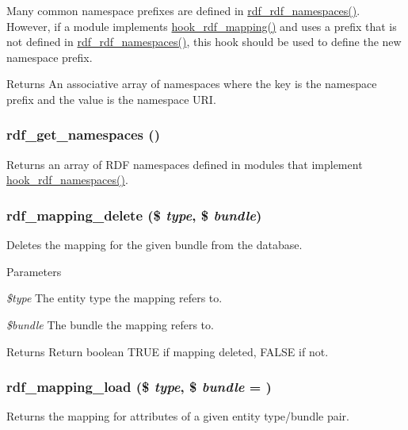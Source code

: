 Many common namespace prefixes are defined in \hyperlink{group__rdf_gaed65d375e129af058947c2d614eb1d3c}{rdf\_\-rdf\_\-namespaces()}. However, if a module implements \hyperlink{group__rdf_gae3e7f047bdcb9309b323e2af09966765}{hook\_\-rdf\_\-mapping()} and uses a prefix that is not defined in \hyperlink{group__rdf_gaed65d375e129af058947c2d614eb1d3c}{rdf\_\-rdf\_\-namespaces()}, this hook should be used to define the new namespace prefix.

\begin{DoxyReturn}{Returns}
An associative array of namespaces where the key is the namespace prefix and the value is the namespace URI. 
\end{DoxyReturn}
\hypertarget{group__rdf_ga395ff70b78c0363ca9ce631b3d15e774}{
\subsubsection[{rdf\_\-get\_\-namespaces}]{\setlength{\rightskip}{0pt plus 5cm}rdf\_\-get\_\-namespaces ()}}
\label{group__rdf_ga395ff70b78c0363ca9ce631b3d15e774}
Returns an array of RDF namespaces defined in modules that implement \hyperlink{group__rdf_ga32e59c5e172304a5f49ec7d76ee6bf3b}{hook\_\-rdf\_\-namespaces()}. \hypertarget{group__rdf_ga59c3470135f39d1b607e03a0aa774470}{
\subsubsection[{rdf\_\-mapping\_\-delete}]{\setlength{\rightskip}{0pt plus 5cm}rdf\_\-mapping\_\-delete (\$ {\em type}, \/  \$ {\em bundle})}}
\label{group__rdf_ga59c3470135f39d1b607e03a0aa774470}
Deletes the mapping for the given bundle from the database.


\begin{DoxyParams}{Parameters}
\item[{\em \$type}]The entity type the mapping refers to. \item[{\em \$bundle}]The bundle the mapping refers to.\end{DoxyParams}
\begin{DoxyReturn}{Returns}
Return boolean TRUE if mapping deleted, FALSE if not. 
\end{DoxyReturn}
\hypertarget{group__rdf_ga130340d3ee5b36d5f7da31160b9460ac}{
\subsubsection[{rdf\_\-mapping\_\-load}]{\setlength{\rightskip}{0pt plus 5cm}rdf\_\-mapping\_\-load (\$ {\em type}, \/  \$ {\em bundle} = {})}}
\label{group__rdf_ga130340d3ee5b36d5f7da31160b9460ac}
Returns the mapping for attributes of a given entity type/bundle pair.


